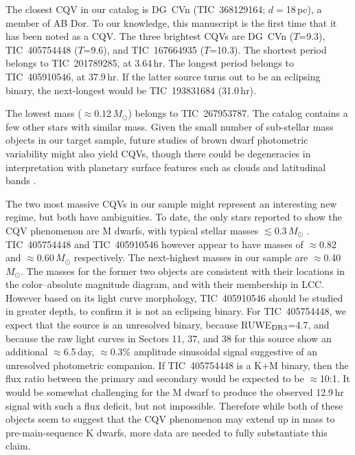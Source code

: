 \documentclass[11pt,twocolumn,tighten]{aastex63}
\begin{document}
The closest CQV in our catalog is DG~CVn (TIC~368129164;
$d$$=$18\,pc), a member of AB Dor.  To our knowledge, this manuscript
is the first time that it has been noted as a CQV.  The three
brightest CQVs are DG~CVn ($T$=9.3), TIC~405754448 ($T$=9.6), and
TIC~167664935 ($T$=10.3).  The shortest period belongs to
TIC~201789285, at 3.64\,hr.  The longest period belongs to
TIC~405910546, at 37.9\,hr.  If the latter source turns out to be an
eclipsing binary, the next-longest would be TIC~193831684 (31.0\,hr).

The lowest mass ($\approx 0.12$\,$M_\odot$) belongs to TIC~267953787.
The catalog contains a few other stars with similar mass.  Given the
small number of sub-stellar mass objects in our target sample, future
studies of brown dwarf photometric variability might also yield CQVs,
though there could be degeneracies in interpretation with planetary
surface features such as clouds and latitudinal bands
\citep[e.g.][]{2021ApJ...906...64A,2022ApJ...924...68V}.

The two most massive CQVs in our sample might represent an interesting
new regime, but both have ambiguities.  To date, the only stars
reported to show the CQV phenomenon are M dwarfs, with typical stellar
masses $\lesssim$0.3\,$M_\odot$
\citep{2017AJ....153..152S,2022AJ....163..144G}.  TIC~405754448 and
TIC~405910546 however appear to have masses of $\approx$0.82 and
$\approx$0.60\,$M_\odot$ respectively.  The next-highest masses in our
sample are $\approx$0.40\,$M_\odot$.  The masses for the former two
objects are consistent with their locations in the color--absolute
magnitude diagram, and with their membership in LCC.  However based on
its light curve morphology, TIC~405910546 should be studied in greater
depth, to confirm it is not an eclipsing binary.  For TIC~405754448,
we expect that the source is an unresolved binary, because RUWE$_{\rm
DR3}$=4.7, and because the raw light curves in Sectors 11, 37, and 38
for this source show an additional $\approx$6.5\,day, $\approx$0.3\%
amplitude sinusoidal signal suggestive of an unresolved photometric
companion.  If TIC~405754448 is a K+M binary, then the flux ratio
between the primary and secondary would be expected to be
$\approx$10:1.  It would be somewhat challenging for the M dwarf to
produce the observed 12.9\,hr signal with such a flux deficit, but not
impossible.  Therefore while both of these objects seem to suggest
that the CQV phenomenon may extend up in mass to pre-main-sequence K
dwarfs, more data are needed to fully substantiate this claim.
\end{document}
